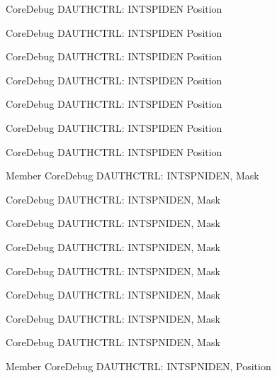 \begin{DoxyRefList}
\label{deprecated__deprecated000282}%
%
Core\+Debug DAUTHCTRL\+: INTSPIDEN Position 

\label{deprecated__deprecated000361}%
%
Core\+Debug DAUTHCTRL\+: INTSPIDEN Position 

\label{deprecated__deprecated000437}%
%
Core\+Debug DAUTHCTRL\+: INTSPIDEN Position 

\label{deprecated__deprecated000143}%
%
Core\+Debug DAUTHCTRL\+: INTSPIDEN Position 

\label{deprecated__deprecated000219}%
%
Core\+Debug DAUTHCTRL\+: INTSPIDEN Position 

\label{deprecated__deprecated000089}%
%
Core\+Debug DAUTHCTRL\+: INTSPIDEN Position 

\label{deprecated__deprecated000540}%
%
Core\+Debug DAUTHCTRL\+: INTSPIDEN Position  
\item[Member \doxylink{group__CMSIS__SCB_gadad0bf68d32cba49c1ea7534122c2752}{Core\+Debug\+\_\+\+DAUTHCTRL\+\_\+\+INTSPNIDEN\+\_\+\+Msk} ]\label{deprecated__deprecated000434}%
%
Core\+Debug DAUTHCTRL\+: INTSPNIDEN, Mask 

\label{deprecated__deprecated000086}%
%
Core\+Debug DAUTHCTRL\+: INTSPNIDEN, Mask 

\label{deprecated__deprecated000279}%
%
Core\+Debug DAUTHCTRL\+: INTSPNIDEN, Mask 

\label{deprecated__deprecated000216}%
%
Core\+Debug DAUTHCTRL\+: INTSPNIDEN, Mask 

\label{deprecated__deprecated000639}%
%
Core\+Debug DAUTHCTRL\+: INTSPNIDEN, Mask 

\label{deprecated__deprecated000537}%
%
Core\+Debug DAUTHCTRL\+: INTSPNIDEN, Mask 

\label{deprecated__deprecated000358}%
%
Core\+Debug DAUTHCTRL\+: INTSPNIDEN, Mask 

\label{deprecated__deprecated000140}%
%
Core\+Debug DAUTHCTRL\+: INTSPNIDEN, Mask  
\item[Member \doxylink{group__CMSIS__SCB_gaf733a36e6b4717a604f7d77c05dfceb4}{Core\+Debug\+\_\+\+DAUTHCTRL\+\_\+\+INTSPNIDEN\+\_\+\+Pos} ]\label{deprecated__deprecated000638}%
%
Core\+Debug DAUTHCTRL\+: INTSPNIDEN, Position 


\end{DoxyRefList}
